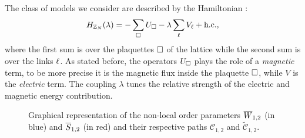 The class of models we consider are described by the Hamiltonian \cite{tagliacozzo2011entanglement, hamma2008adiabatic, trebst2007topological}:
\begin{equation}
    H_{\mathbb{Z}_N}(\lambda) = - \sum_{\square} U_{\square} - \lambda \sum_{\ell} V_{\ell} + \text{h.c.},
    \label{eq:hamiltonian_base}
\end{equation}
where the first sum is over the plaquettes $\square$ of the lattice while the second sum is over the links $\ell$.
As stated before, the operators $U_{\square}$ plays the role of a \emph{magnetic} term, to be more precise it is the magnetic flux inside the plaquette $\square$, while $V$ is the \emph{electric} term.
The coupling $\lambda$ tunes the relative strength of the electric and magnetic energy contribution.

\begin{figure}[t]
    \centering
    
    \caption{Graphical representation of the non-local order parameters $\overline{W}_{1,2}$ (in blue) and $\overline{S}_{1,2}$ (in red) and their respective paths $\mathcal{C}_{1,2}$ and $\tilde{\mathcal{C}}_{1,2}$.}
    \label{fig:nonlocal_operators}
\end{figure}




